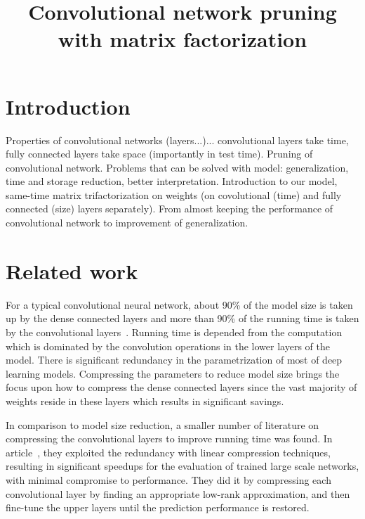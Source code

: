 \documentclass{article} %
\title{Convolutional network pruning with matrix factorization}
\begin{document}
\maketitle

\begin{abstract}

\end{abstract}

\section{Introduction}
Properties of convolutional networks (layers...)... convolutional layers take time, fully connected layers take space (importantly in test time). Pruning of convolutional network. Problems that can be solved with model: generalization, time and storage reduction, better interpretation. Introduction to our model, same-time matrix trifactorization on weights (on covolutional (time) and fully connected (size) layers separately). From almost keeping the performance of convolutional network to improvement of generalization.

\section{Related work}

For a typical convolutional neural network, about 90\% of the model size is taken up by the dense connected layers and more than 90\% of the running time is taken by the convolutional layers~\cite{zeiler2014visualizing}. Running time is depended from the computation which is dominated by the convolution operations in the lower layers of the model. There is significant redundancy in the parametrization of most of deep learning models. Compressing the parameters to reduce model size brings the focus upon how to compress the dense connected layers since the vast majority of weights reside in these layers which results in significant savings. 

In comparison to model size reduction, a smaller number of literature on compressing the convolutional layers to improve running time was found. In article~\cite{denton2014exploiting}, they exploited the redundancy with linear compression techniques, resulting in significant speedups for the evaluation of trained large scale networks, with minimal compromise to performance. They did it by compressing each convolutional layer by finding an appropriate low-rank approximation, and then fine-tune the upper layers until the prediction performance is restored. 
\end{document}
